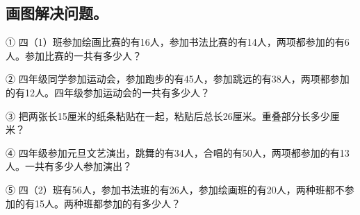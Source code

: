 \subsection*{画图解决问题。}
\noindent ① 四（1）班参加绘画比赛的有16人，参加书法比赛的有14人，两项都参加的有6人。参加比赛的一共有多少人？\par
{}
\noindent ② 四年级同学参加运动会，参加跑步的有45人，参加跳远的有38人，两项都参加的有12人。四年级参加运动会的一共有多少人？\par
{}
\noindent ③ 把两张长15厘米的纸条粘贴在一起，粘贴后总长26厘米。重叠部分长多少厘米？\par
{}
\noindent ④ 四年级参加元旦文艺演出，跳舞的有34人，合唱的有50人，两项都参加的有13人。一共有多少人参加演出？\par
{}
\noindent ⑤ 四（2）班有56人，参加书法班的有26人，参加绘画班的有20人，两种班都不参加的有15人。两种班都参加的有多少人？\par
{}
